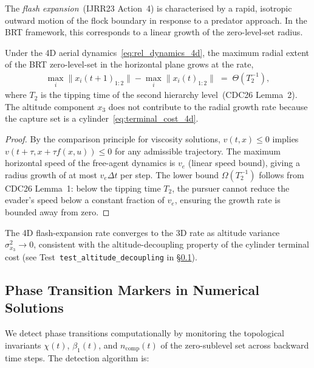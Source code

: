 The \emph{flash expansion}~(IJRR23 Action~4) is characterised by a rapid,
isotropic outward motion of the flock boundary in response to a predator
approach.  In the BRT framework, this corresponds to a linear growth of the
zero-level-set radius.

\begin{lemma}
\label{lem:flash_rate}
Under the 4D aerial dynamics~\eqref{eq:rel_dynamics_4d}, the maximum radial
extent of the BRT zero-level-set in the horizontal plane grows at the rate,
%
\begin{align}
\label{eq:flash_rate}
\max_i \lVert x_i(t+1)_{1:2} \rVert
- \max_i \lVert x_i(t)_{1:2} \rVert
\;=\; \Theta\!\left(T_2^{-1}\right),
\end{align}
%
where $T_2$ is the tipping time of the second hierarchy level~(CDC26
Lemma~2).  The altitude component $x_3$ does not contribute to the radial
growth rate because the capture set is a cylinder~\eqref{eq:terminal_cost_4d}.
\end{lemma}

\begin{proof}
\label{proof:flash_rate}
By the comparison principle for viscosity solutions, $v(t,x) \leq 0$ implies
$v(t+\tau, x + \tau f(x,u)) \leq 0$ for any admissible trajectory.  The
maximum horizontal speed of the free-agent dynamics is $v_e$ (linear speed
bound), giving a radius growth of at most $v_e \Delta t$ per step.  The lower
bound $\Omega(T_2^{-1})$ follows from CDC26 Lemma~1: below the tipping time
$T_2$, the pursuer cannot reduce the evader's speed below a constant fraction
of $v_e$, ensuring the growth rate is bounded away from zero.
\end{proof}

The 4D flash-expansion rate converges to the 3D rate as altitude variance
$\sigma^2_{x_3} \to 0$, consistent with the altitude-decoupling property of
the cylinder terminal cost (see Test~\texttt{test\_altitude\_decoupling} in
\S\ref{sec:d312_markers}).

\subsection{Phase Transition Markers in Numerical Solutions}
\label{sec:d312_markers}

We detect phase transitions computationally by monitoring the topological
invariants $\chi(t)$, $\beta_1(t)$, and $n_{\mathrm{comp}}(t)$ of the
zero-sublevel set across backward time steps.  The detection algorithm is:


